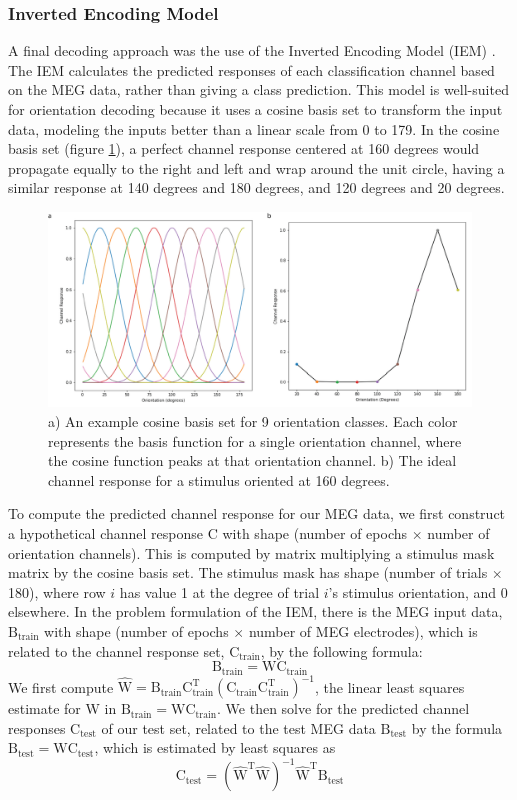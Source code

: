 \documentclass[../main.tex]{subfiles}
\begin{document}
\subsubsection{Inverted Encoding Model}
A final decoding approach was the use of the Inverted Encoding Model (IEM) \citep{Brouwer09, Brouwer, GARCIA2013515,sprague_serences_2013, sprague_saproo_serences_2015}. The IEM calculates the predicted responses of each classification channel based on the MEG data, rather than giving a class prediction. This model is well-suited for orientation decoding because it uses a cosine basis set to transform the input data, modeling the inputs better than a linear scale from 0 to 179. In the cosine basis set (figure \ref{basis_set}), a perfect channel response centered at 160 degrees would propagate equally to the right and left and wrap around the unit circle, having a similar response at 140 degrees and 180 degrees, and 120 degrees and 20 degrees.

\begin{figure}
    \centering
    \includegraphics[scale=0.7]{figures/methods/basis_set.png}
    \caption{a) An example cosine basis set for 9 orientation classes. Each color represents the basis function for a single orientation channel, where the cosine function peaks at that orientation channel. b) The ideal channel response for a stimulus oriented at 160 degrees.}
    \label{basis_set}
\end{figure}

To compute the predicted channel response for our MEG data, we first construct a hypothetical channel
response $\mathrm{C}$ with shape (number of epochs $\times$ number of orientation channels). This is computed by matrix multiplying a stimulus mask matrix by the cosine basis set. The stimulus mask has shape (number of trials $\times$ 180), where row $i$ has value 1 at the degree of trial $i$'s stimulus orientation, and 0 elsewhere. In the problem formulation of the IEM, there is the MEG input data, $\mathrm{B_{train}}$ with shape (number of epochs $\times$ number of MEG electrodes), which is related to the channel response set, $\mathrm{C_{train}}$, by the following formula:
$$ \mathrm{B_{train} = W C_{train}}$$
We first compute $\mathrm{\hat{W} = B_{train} C_{train}^T (C_{train} C_{train}^T)^{-1}}$, the linear least squares estimate for W in $ \mathrm{B_{train} = W C_{train}}$. We then solve for the predicted channel responses $\mathrm{C_{test}}$  of our test set, related to the test MEG data $\mathrm{B_{test}}$ by the formula $\mathrm{B_{test} = W C_{test}}$, which is estimated by least squares as 
$$\mathrm{C_{test} = (\hat{W}^T \hat{W})^{-1} \hat{W}^T B_{test}}$$
\end{document}
